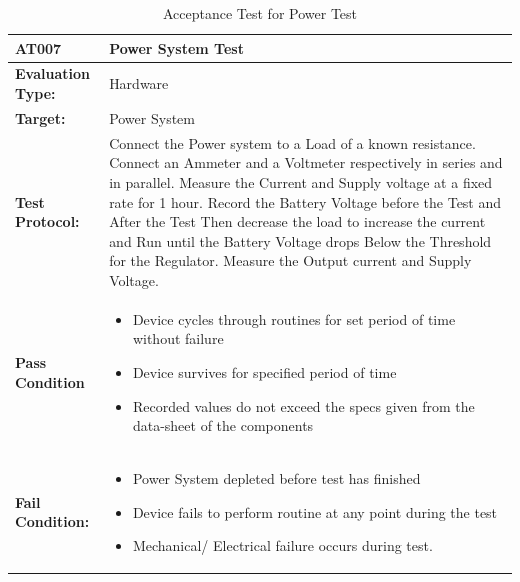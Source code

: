 \begin{table}[H]
    \centering
    \caption{Acceptance Test for Power Test}
    \begin{tabular}{|m{}|m{}|}
    \hline
   \textbf{AT007 }& \textbf{Power System Test} \\
     \hline
    \textbf{Evaluation Type:} & Hardware\\
     \hline
    \textbf{Target: } & Power System \\
    \hline
    \textbf{Test Protocol:} & Connect the Power system to a Load of a known resistance. Connect an Ammeter and a Voltmeter respectively in series and in parallel. Measure the Current and Supply voltage at a fixed rate for 1 hour. Record the Battery Voltage before the Test and After the Test Then decrease the load to increase the current and Run until the Battery Voltage drops Below the Threshold for the Regulator. Measure the Output current and Supply Voltage. \\
    \hline
    \textbf{Pass Condition} & \vspace{5pt} \begin{itemize}
        \item Device cycles through routines for set period of time without failure
        \item Device survives for specified period of time
        \item Recorded values do not exceed the specs given from the data-sheet of the components
    \end{itemize} \\
    \hline
    \textbf{Fail Condition:} & \vspace{5pt} \begin{itemize}
        \item Power System depleted before test has finished
        \item Device fails to perform routine at any point during the test
        \item Mechanical/ Electrical failure occurs during test.
        \end{itemize}\\
        \hline
    \end{tabular}
    \label{tab:AT007}
\end{table}


